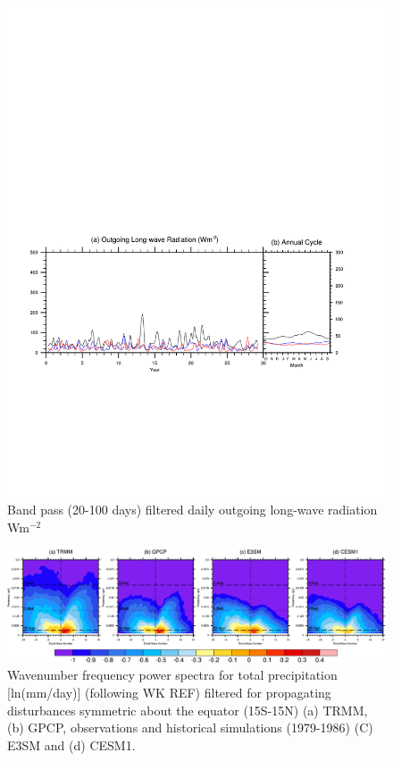 \documentclass[draft,ms]{AGUTeX}
\begin{document}
\begin{article}
\begin{figure}[t]
  \begin{center}
    \noindent\includegraphics[width=1.1\textwidth,angle=0.]{./figs/f_bpass.pdf}
  \end{center}
  \caption{Band pass (20-100 days) filtered daily outgoing long-wave radiation Wm$^{-2}$} 
\label{f_bpass}
\end{figure}

\begin{figure}[t]
  \begin{center}
    \noindent\includegraphics[width=1.1\textwidth,angle=0.]{./figs/f_kf_sym_PRECT.pdf}
  \end{center}
  \caption{Wavenumber frequency power spectra for total precipitation [ln(mm/day)] (following WK REF) filtered for propagating disturbances symmetric about the equator (15\deg S-15\deg N)  (a) TRMM, (b) GPCP, observations and historical simulations (1979-1986) (C) E3SM  and (d) CESM1.} 
\label{f_kf_sym_PRECT}
\end{figure}


\end{article}
\end{document}
